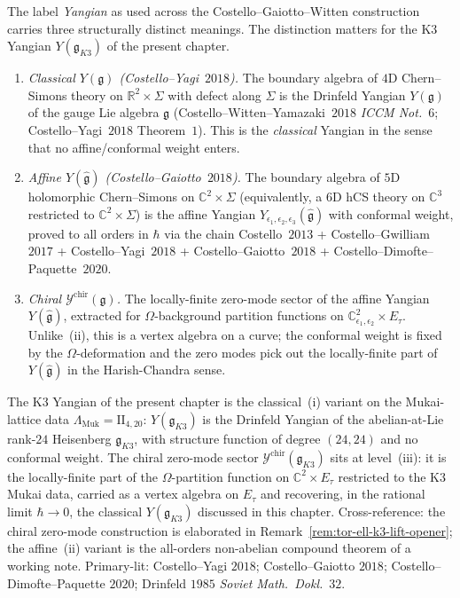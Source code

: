 \begin{remark}
\label{rmk:k3-yangian-chiral-disambiguation}
The label \emph{Yangian} as used across the Costello--Gaiotto--Witten
construction carries three structurally distinct meanings. The distinction
matters for the K3 Yangian $Y(\mathfrak{g}_{K3})$ of the present chapter.
\begin{enumerate}[label=\textup{(\roman*)}]
\item \emph{Classical $Y(\mathfrak g)$ (Costello--Yagi~$2018$).} The
 boundary algebra of $4$D Chern--Simons theory on
 $\mathbb R^2\times\Sigma$ with defect along $\Sigma$ is the Drinfeld
 Yangian $Y(\mathfrak g)$ of the gauge Lie algebra $\mathfrak g$
 (Costello--Witten--Yamazaki~$2018$ \emph{ICCM Not.}~$6$; Costello--Yagi~$2018$
 Theorem~$1$). This is the \emph{classical} Yangian in the sense that
 no affine/conformal weight enters.
\item \emph{Affine $Y(\widehat{\mathfrak g})$ (Costello--Gaiotto~$2018$).}
 The boundary algebra of $5$D holomorphic Chern--Simons on
 $\mathbb C^2\times\Sigma$ (equivalently, a $6$D hCS theory
 on $\mathbb C^3$ restricted to $\mathbb C^2\times\Sigma$) is the
 affine Yangian $Y_{\epsilon_1,\epsilon_2,\epsilon_3}(\widehat{\mathfrak g})$
 with conformal weight, proved to all orders in $\hbar$ via the chain
 Costello~$2013$ + Costello--Gwilliam~$2017$ + Costello--Yagi~$2018$ +
 Costello--Gaiotto~$2018$ + Costello--Dimofte--Paquette~$2020$.
\item \emph{Chiral $\mathcal Y^{\mathrm{chir}}(\mathfrak g)$.} The
 locally-finite zero-mode sector of the affine Yangian
 $Y(\widehat{\mathfrak g})$, extracted for
 $\Omega$-background partition functions on
 $\mathbb C^2_{\epsilon_1,\epsilon_2}\times E_\tau$. Unlike~(ii), this is
 a vertex algebra on a curve; the conformal weight is fixed by the
 $\Omega$-deformation and the zero modes pick out the locally-finite
 part of $Y(\widehat{\mathfrak g})$ in the Harish-Chandra sense.
\end{enumerate}
The K3 Yangian of the present chapter is the
classical~(i) variant on the Mukai-lattice data
$\Lambda_{\mathrm{Muk}}=\mathrm{II}_{4,20}$: $Y(\mathfrak g_{K3})$ is
the Drinfeld Yangian of the abelian-at-Lie rank-$24$ Heisenberg
$\mathfrak g_{K3}$, with structure function of degree $(24,24)$ and no
conformal weight. The chiral zero-mode sector
$\mathcal Y^{\mathrm{chir}}(\mathfrak g_{K3})$ sits at level~(iii): it
is the locally-finite part of the $\Omega$-partition function on
$\mathbb C^2\times E_\tau$ restricted to the K3 Mukai data, carried as
a vertex algebra on $E_\tau$ and recovering, in the rational limit
$\hbar\to 0$, the classical $Y(\mathfrak g_{K3})$ discussed in this
chapter. Cross-reference: the chiral zero-mode construction is
elaborated in \cite{VolI}
Remark~\ref{rem:tor-ell-k3-lift-opener}; the affine~(ii) variant is the
all-orders non-abelian compound theorem of
a working note. Primary-lit: Costello--Yagi
$2018$; Costello--Gaiotto $2018$; Costello--Dimofte--Paquette $2020$;
Drinfeld $1985$ \emph{Soviet Math.\ Dokl.}~$32$.
\end{remark}



